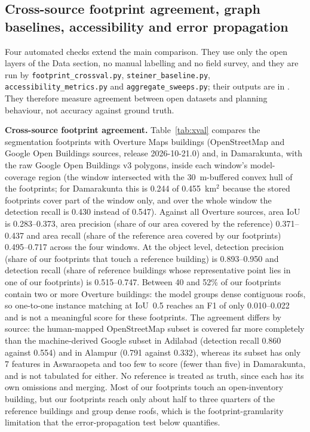 \documentclass[preprint,12pt]{elsarticle}
\begin{document}
\subsection{Cross-source footprint agreement, graph baselines, accessibility and error propagation}\label{sec:res4}
Four automated checks extend the main comparison. They use only the open layers of the Data section, no manual labelling and no field survey, and they are run by \texttt{footprint\_crossval.py}, \texttt{steiner\_baseline.py}, \texttt{accessibility\_metrics.py} and \texttt{aggregate\_sweeps.py}; their outputs are in . They therefore measure agreement between open datasets and planning behaviour, not accuracy against ground truth.

\textbf{Cross-source footprint agreement.} Table~\ref{tab:xval} compares the segmentation footprints with Overture Maps buildings (OpenStreetMap and Google Open Buildings sources, release 2026-10-21.0) and, in Damarakunta, with the raw Google Open Buildings v3 polygons, inside each window's model-coverage region (the window intersected with the 30~m-buffered convex hull of the footprints; for Damarakunta this is 0.244 of 0.455~km$^2$ because the stored footprints cover part of the window only, and over the whole window the detection recall is 0.430 instead of 0.547). Against all Overture sources, area IoU is 0.283--0.373, area precision (share of our area covered by the reference) 0.371--0.437 and area recall (share of the reference area covered by our footprints) 0.495--0.717 across the four windows. At the object level, detection precision (share of our footprints that touch a reference building) is 0.893--0.950 and detection recall (share of reference buildings whose representative point lies in one of our footprints) is 0.515--0.747. Between 40 and 52\% of our footprints contain two or more Overture buildings: the model groups dense contiguous roofs, so one-to-one instance matching at IoU~0.5 reaches an F1 of only 0.010--0.022 and is not a meaningful score for these footprints. The agreement differs by source: the human-mapped OpenStreetMap subset is covered far more completely than the machine-derived Google subset in Adilabad (detection recall 0.860 against 0.554) and in Alampur (0.791 against 0.332), whereas its subset has only 7 features in Aswaraopeta and too few to score (fewer than five) in Damarakunta, and is not tabulated for either. No reference is treated as truth, since each has its own omissions and merging. Most of our footprints touch an open-inventory building, but our footprints reach only about half to three quarters of the reference buildings and group dense roofs, which is the footprint-granularity limitation that the error-propagation test below quantifies.
\end{document}
